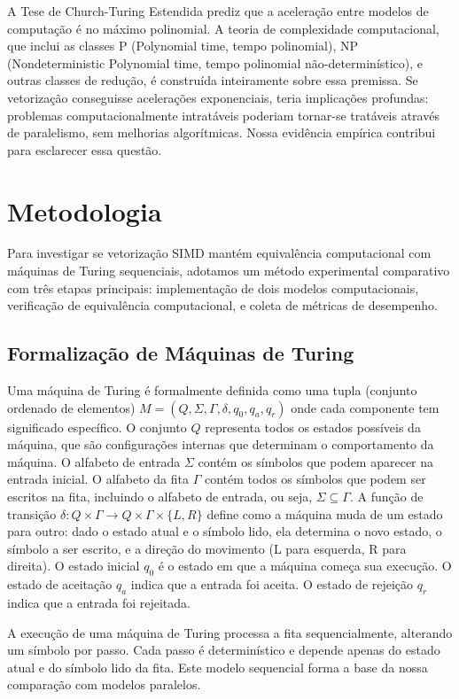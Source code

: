 \documentclass[12pt]{article}
\begin{document}
A Tese de Church-Turing Estendida prediz que a aceleração entre modelos de computação é no máximo polinomial. A teoria de complexidade computacional, que inclui as classes P (Polynomial time, tempo polinomial), NP (Nondeterministic Polynomial time, tempo polinomial não-determinístico), e outras classes de redução, é construída inteiramente sobre essa premissa. Se vetorização conseguisse acelerações exponenciais, teria implicações profundas: problemas computacionalmente intratáveis poderiam tornar-se tratáveis através de paralelismo, sem melhorias algorítmicas. Nossa evidência empírica contribui para esclarecer essa questão.

\section{Metodologia}

Para investigar se vetorização SIMD mantém equivalência computacional com máquinas de Turing sequenciais, adotamos um método experimental comparativo com três etapas principais: implementação de dois modelos computacionais, verificação de equivalência computacional, e coleta de métricas de desempenho.

\subsection{Formalização de Máquinas de Turing}

Uma máquina de Turing é formalmente definida como uma tupla (conjunto ordenado de elementos) $M = (Q, \Sigma, \Gamma, \delta, q_0, q_a, q_r)$ onde cada componente tem significado específico. O conjunto $Q$ representa todos os estados possíveis da máquina, que são configurações internas que determinam o comportamento da máquina. O alfabeto de entrada $\Sigma$ contém os símbolos que podem aparecer na entrada inicial. O alfabeto da fita $\Gamma$ contém todos os símbolos que podem ser escritos na fita, incluindo o alfabeto de entrada, ou seja, $\Sigma \subseteq \Gamma$. A função de transição $\delta: Q \times \Gamma \rightarrow Q \times \Gamma \times \{L, R\}$ define como a máquina muda de um estado para outro: dado o estado atual e o símbolo lido, ela determina o novo estado, o símbolo a ser escrito, e a direção do movimento (L para esquerda, R para direita). O estado inicial $q_0$ é o estado em que a máquina começa sua execução. O estado de aceitação $q_a$ indica que a entrada foi aceita. O estado de rejeição $q_r$ indica que a entrada foi rejeitada.

A execução de uma máquina de Turing processa a fita sequencialmente, alterando um símbolo por passo. Cada passo é determinístico e depende apenas do estado atual e do símbolo lido da fita. Este modelo sequencial forma a base da nossa comparação com modelos paralelos.
\end{document}
